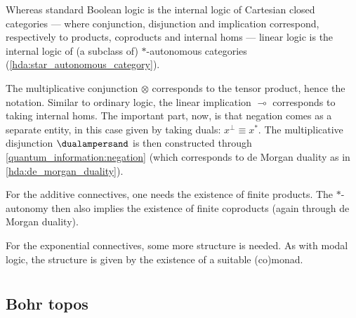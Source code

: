     \begin{property}
        Whereas standard Boolean logic is the internal logic of Cartesian closed categories --- where conjunction, disjunction and implication correspond, respectively to products, coproducts and internal homs --- linear logic is the internal logic of (a subclass of) $\ast$-autonomous categories (\cref{hda:star_autonomous_category}).

        The multiplicative conjunction $\otimes$ corresponds to the tensor product, hence the notation. Similar to ordinary logic, the linear implication $\multimap$ corresponds to taking internal homs. The important part, now, is that negation comes as a separate entity, in this case given by taking duals: $x^\perp\equiv x^*$. The multiplicative disjunction $\dualampersand$ is then constructed through \cref{quantum_information:negation} (which corresponds to de Morgan duality as in \cref{hda:de_morgan_duality}).

        For the additive connectives, one needs the existence of finite products. The $\ast$-autonomy then also implies the existence of finite coproducts (again through de Morgan duality).

        For the exponential connectives, some more structure is needed. As with modal logic, the structure is given by the existence of a suitable (co)monad.
    \end{property}

\section{}
\subsection{Bohr topos}


